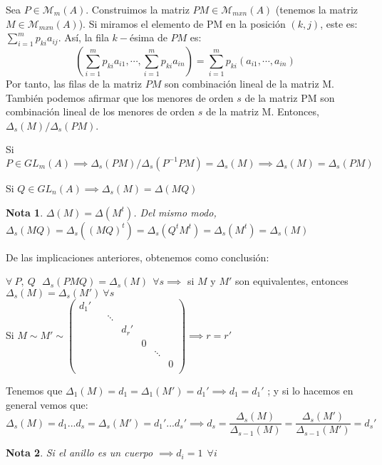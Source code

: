 \documentclass[11pt, a4paper, titlepage]{article}
\theoremstyle{theorem-style}
\theoremstyle{definition-style}
\theoremstyle{remark-style}
\newtheorem*{nota}{Nota}
\theoremstyle{example-style}
\begin{document}
Sea $P \in \mathcal{M}_m(A)$. Construimos la matriz $PM\in \mathcal{M}_{mxn}(A)$ (tenemos la matriz $M \in \mathcal{M}_{mxn}(A)$). Si miramos el elemento de PM en la posición $(k,j)$, este es: $\sum_{i=1}^m p_{ki}a_{ij}$. Así, la fila $k-$ésima de $PM$ es:
\[
(\sum_{i=1}^m p_{ki}a_{i1}, \cdots , \sum_{i=1}^m p_{ki}a_{in}) = \sum_{i=1}^m p_{ki}(a_{i1},\cdots , a_{in})
\]
Por tanto, las filas de la matriz $PM$ son combinación lineal de la matriz M. También podemos afirmar que los menores de orden $s$ de la matriz PM son combinación lineal de los menores de orden $s$ de la matriz M. Entonces, $\Delta_s(M)/\Delta_s(PM)$.

Si $P\in GL_m(A)\implies \Delta_s(PM) / \Delta_s(P^{-1}PM) = \Delta_s(M) \implies \Delta_s(M) = \Delta_s(PM)$

Si $Q \in GL_n(A) \implies \Delta_s (M) = \Delta(MQ)$

\begin{nota}
	$\Delta(M) = \Delta(M^t)$. Del mismo modo, $\Delta_s(MQ) = \Delta_s((MQ)^t) =  \Delta_s (Q^tM^t) = \Delta_s (M^t) =  \Delta_s(M)$
\end{nota}

De las implicaciones anteriores, obtenemos como conclusión:

$\forall \ P,\ Q \ \ \ \Delta_s(PMQ) = \Delta_s(M) \ \ \forall s \implies$ 
si $M$ y $M'$ son equivalentes, entonces $\Delta_s(M) = \Delta_s(M') \ \forall s$\\
Si $M \sim M' \sim \begin{pmatrix}
 d_{1}'&  &  & & \\
 &  & \ddots &  &  \\
 & & &d_{r}' &\\
 & & & & 0 \\
 & & & & & \ddots& \\
 & & & &  & & 0 \\
\end{pmatrix}  \implies r = r'$

Tenemos que $\Delta_1(M) = d_1 = \Delta_1 (M') = d_1' \implies d_1 = d_1'$ ; y si lo hacemos en general vemos que:
\[
\Delta_s(M) = d_1...d_s = \Delta_s(M') = d_1'...d_s' \implies d_s =  \frac{\Delta_s(M)}{\Delta_{s-1}(M)} =  \frac{\Delta_s(M')}{\Delta_{s-1}(M')} = d_s'
\]

\begin{nota}
	Si el anillo es un cuerpo $\implies d_i = 1 \ \ \forall i$
\end{nota}
\end{document}
